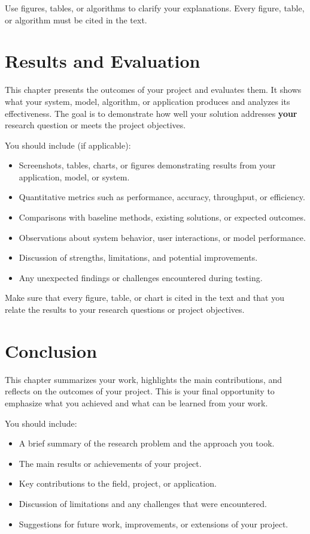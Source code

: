 \documentclass[12pt]{report}
\begin{document}
Use figures, tables, or algorithms to clarify your explanations. Every figure, table, or algorithm must be cited in the text.




\chapter{Results and Evaluation}

This chapter presents the outcomes of your project and evaluates them. It shows what your system, model, algorithm, or application produces and analyzes its effectiveness. The goal is to demonstrate how well your solution addresses \textbf{your} research question or meets the project objectives.

You should include (if applicable):

\begin{itemize}
    \item Screenshots, tables, charts, or figures demonstrating results from your application, model, or system.
    \item Quantitative metrics such as performance, accuracy, throughput, or efficiency.
    \item Comparisons with baseline methods, existing solutions, or expected outcomes.
    \item Observations about system behavior, user interactions, or model performance.
    \item Discussion of strengths, limitations, and potential improvements.
    \item Any unexpected findings or challenges encountered during testing.
\end{itemize}

Make sure that every figure, table, or chart is cited in the text and that you relate the results to your research questions or project objectives.


\chapter{Conclusion}

This chapter summarizes your work, highlights the main contributions, and reflects on the outcomes of your project. This is your final opportunity to emphasize what you achieved and what can be learned from your work.

You should include:

\begin{itemize}
    \item A brief summary of the research problem and the approach you took.
    \item The main results or achievements of your project.
    \item Key contributions to the field, project, or application.
    \item Discussion of limitations and any challenges that were encountered.
    \item Suggestions for future work, improvements, or extensions of your project.
\end{itemize}
\end{document}
